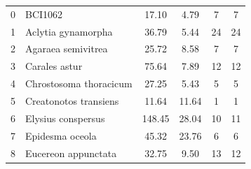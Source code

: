 \documentclass[12pt,a4paper]{article}
\begin{document}
\begin{table}[h]
\begin{tabular}{llcccc}
		0            & BCI1062                            & 17.10                                                & 4.79                                            & 7                                                         & 7                                                          \\
		1            & Aclytia gynamorpha          & 36.79                                                & 5.44                                            & 24                                                        & 24                                                         \\
		2            & Agaraea semivitrea          & 25.72                                                & 8.58                                            & 7                                                         & 7                                                          \\
		3            & Carales astur              & 75.64                                                & 7.89                                            & 12                                                        & 12                                                         \\
		4            & Chrostosoma thoracicum       & 27.25                                                & 5.43                                            & 5                                                         & 5                                                          \\
		5            & Creatonotos transiens                  & 11.64                                                & 11.64                                           & 1                                                         & 1                                                          \\
		6            & Elysius conspersus           & 148.45                                               & 28.04                                           & 10                                                        & 11                                                         \\
		7            & Epidesma oceola              & 45.32                                                & 23.76                                           & 6                                                         & 6                                                          \\
		8            & Eucereon appunctata          & 32.75                                                & 9.50                                            & 13                                                        & 12                                                         \\

\end{tabular}
\end{table}
\end{document}
